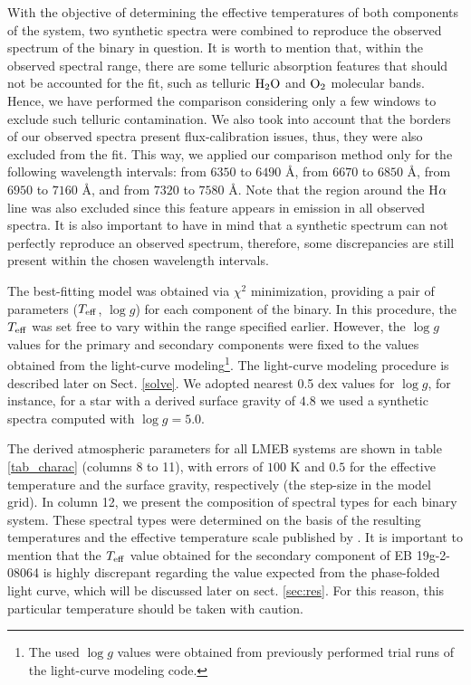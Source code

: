 \documentclass[fleqn,usenatbib]{mnras}
\begin{document}
With the objective of determining the effective temperatures of both components of the system, two synthetic spectra were combined to reproduce the observed spectrum of the binary in question. It is worth to mention that, within the observed spectral range, there are some telluric absorption features that should not be accounted for the fit, such as telluric ${\rm H{_2}O}$ and ${\rm O{_2}}$ molecular bands. Hence, we have performed the comparison considering only a few windows to exclude such telluric contamination. We also took into account that the borders of our observed spectra present flux-calibration issues, thus, they were also excluded from the fit. This way, we applied our comparison method only for the following wavelength intervals: from $6350$ to $6490$ \AA, from $6670$ to $6850$ \AA, from $6950$ to $7160$ \AA, and from $7320$ to $7580$ \AA. Note that the region around the H${\rm \alpha}$ line was also excluded since this feature appears in emission in all observed spectra. It is also important to have in mind that a synthetic spectrum can not perfectly reproduce an observed spectrum, therefore, some discrepancies are still present within the chosen wavelength intervals.

The best-fitting model was obtained via $\chi^2$ minimization, providing a pair of parameters ($T_{\rm eff}$, $\log g$) for each component of the binary. In this procedure, the $T_{\rm eff}$ was set free to vary within the range specified earlier. However, the $\log g$ values for the primary and secondary components were fixed to the values obtained from the light-curve modeling\footnote{The used $\log g$ values were obtained from previously performed trial runs of the light-curve modeling code.}. The light-curve modeling procedure is described later on Sect. \ref{solve}. We adopted nearest 0.5 dex values for $\log g$, for instance, for a star with a derived surface gravity of $4.8$ we used a synthetic spectra computed with $\log g=5.0$.

The derived atmospheric parameters for all LMEB systems are shown in table \ref{tab_charac} (columns 8 to 11), with errors of $100$ K and $0.5$ for the effective temperature and the surface gravity, respectively (the step-size in the model grid). 
In column 12, we present the composition of spectral types for each binary system. These spectral types were determined on the basis of the resulting temperatures and the effective temperature scale published by \citet{Pecaut13}. 
It is important to mention that the $T_{\rm eff}$ value obtained for the secondary component of EB 19g-2-08064 is highly discrepant regarding the value expected from the phase-folded light curve, which will be discussed later on sect. \ref{sec:res}. For this reason, this particular temperature should be taken with caution.
\end{document}
